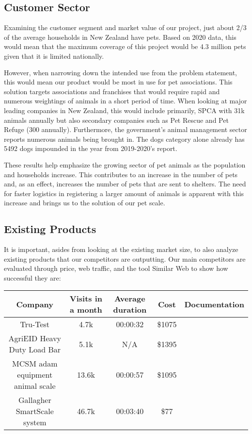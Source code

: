 \subsection{Customer Sector}
Examining the customer segment and market value of our project, just about 2/3 of the average households in New Zealand have pets. Based on 2020 data, this would mean that the maximum coverage of this project would be 4.3 million pets given that it is limited nationally.

However, when narrowing down the intended use from the problem statement, this would mean our product would be most in use for pet associations. This solution targets associations and franchises that would require rapid and numerous weightings of animals in a short period of time. When looking at major leading companies in New Zealand, this would include primarily, SPCA with 31k animals annually but also secondary companies such as Pet Rescue and Pet Refuge (300 annually). Furthermore, the government's animal management sector reports numerous animals being brought in. The dogs category alone already has 5492 dogs impounded in the year from 2019-2020's report.

These results help emphasize the growing sector of pet animals as the population and households increase. This contributes to an increase in the number of pets and, as an effect, increases the number of pets that are sent to shelters. The need for faster logistics in registering a larger amount of animals is apparent with this increase and brings us to the solution of our pet scale.

\subsection{Existing Products}
It is important, asides from looking at the existing market size, to also analyze existing products that our competitors are outputting. Our main competitors are evaluated through price, web traffic, and the tool Similar Web to show how successful they are:

\begin{center}
\begin{tabular}{ |c|c|c|c|c| } 
 \hline
 Company & Visits in a month & Average duration & Cost & Documentation \\ 
 \hline
Tru-Test & 4.7k & 00:00:32 & \$1075 \\ 
 \hline
 AgriEID Heavy Duty Load Bar & 5.1k & N/A & \$1395 \\ 
 \hline
 MCSM adam equipment animal scale & 13.6k & 00:00:57 & \$1095\\ 
 \hline
 Gallagher SmartScale system & 46.7k & 00:03:40 & \$77\\ 
 \hline
\end{tabular}
\end{center}

